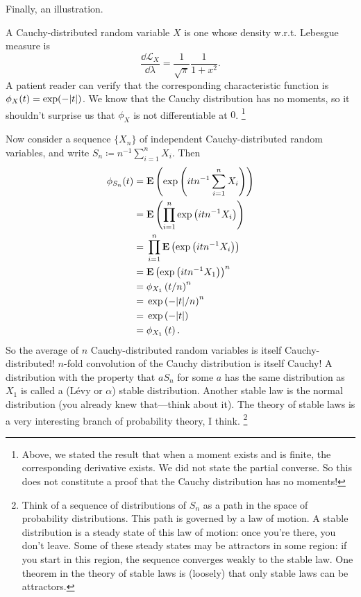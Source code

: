 \documentclass[11pt,letterpaper,reqno,oneside]{article}
\begin{document}
Finally, an illustration.
%
\begin{example}
	\label{example:Cauchy_LLN}
	A Cauchy-distributed random variable $X$ is one whose density w.r.t. Lebesgue measure is
	\begin{equation*}
		\frac{\dd \mathcal{L}_X}{\dd \lambda}
		= \frac{1}{\sqrt{\pi}} \frac{1}{1+x^2} .
	\end{equation*}
	A patient reader can verify that the corresponding characteristic function is $\phi_X(t) = \exp(-\lvert t\rvert)$. We know that the Cauchy distribution has no moments, so it shouldn't surprise us that $\phi_X$ is not differentiable at $0$.%
		\footnote{Above, we stated the result that when a moment exists and is finite, the corresponding derivative exists. We did not state the partial converse. So this does not constitute a proof that the Cauchy distribution has no moments!}

	Now consider a sequence $\{ X_n \}$ of independent Cauchy-distributed random variables, and write $S_n \coloneqq n^{-1} \sum_{i=1}^n X_i$. Then
	\begin{align*}
		\phi_{S_n}(t)
		={}& \mathbf{E}\left( \exp\left( it n^{-1} \sum_{i=1}^n X_i \right) \right)
		\\
		={}& \mathbf{E}\left( \prod_{i=1}^n \exp\left( it n^{-1} X_i \right) \right)
		\\
		={}& \prod_{i=1}^n \mathbf{E}\left( \exp\left( it n^{-1} X_i \right) \right)
		\\
		={}& \mathbf{E}\left( \exp\left( it n^{-1} X_1 \right) \right)^n
		\\
		={}& \phi_{X_1}\left( t / n \right)^n
		\\
		={}& \exp\left( -\lvert t\rvert/n \right)^n
		\\
		={}& \exp\left( -\lvert t\rvert \right) 
		\\
		={}& \phi_{X_1}\left( t \right) .
	\end{align*}
	So the average of $n$ Cauchy-distributed random variables is itself Cauchy-distributed!
	$n$-fold convolution of the Cauchy distribution is itself Cauchy! A distribution with the property that $aS_n$ for some $a$ has the same distribution as $X_1$ is called a (Lévy or $\alpha$) stable distribution. Another stable law is the normal distribution (you already knew that---think about it). The theory of stable laws is a very interesting branch of probability theory, I think.%
		\footnote{\label{footnote:stable_laws}Think of a sequence of distributions of $S_n$ as a path in the space of probability distributions. This path is governed by a law of motion. A stable distribution is a steady state of this law of motion: once you're there, you don't leave. Some of these steady states may be attractors in some region: if you start in this region, the sequence converges weakly to the stable law. One theorem in the theory of stable laws is (loosely) that only stable laws can be attractors.

}
\end{example}
\end{document}
